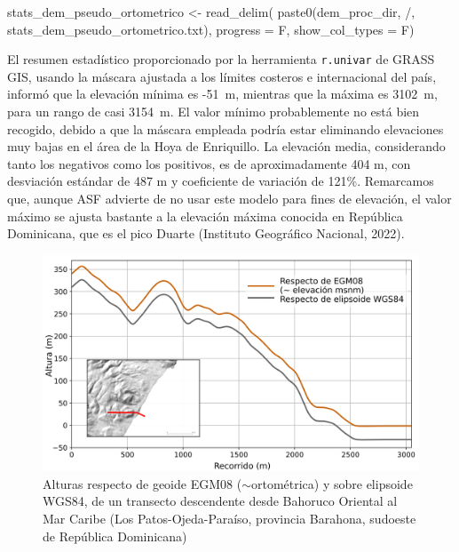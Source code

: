 \documentclass[spanish]{article}
\newenvironment{Shaded}{\begin{snugshade}}{\end{snugshade}}
\newcommand{\AttributeTok}[1]{\textcolor[rgb]{0.77,0.63,0.00}{#1}}
\newcommand{\FunctionTok}[1]{\textcolor[rgb]{0.00,0.00,0.00}{#1}}
\newcommand{\NormalTok}[1]{#1}
\newcommand{\OtherTok}[1]{\textcolor[rgb]{0.56,0.35,0.01}{#1}}
\newcommand{\StringTok}[1]{\textcolor[rgb]{0.31,0.60,0.02}{#1}}
\begin{document}
\begin{Shaded}
\begin{Highlighting}[]
\NormalTok{stats\_dem\_pseudo\_ortometrico }\OtherTok{\textless{}{-}} \FunctionTok{read\_delim}\NormalTok{(}
  \FunctionTok{paste0}\NormalTok{(dem\_proc\_dir, }\StringTok{\textquotesingle{}/\textquotesingle{}}\NormalTok{,}
         \StringTok{\textquotesingle{}stats\_dem\_pseudo\_ortometrico.txt\textquotesingle{}}\NormalTok{),}
  \AttributeTok{progress =}\NormalTok{ F, }\AttributeTok{show\_col\_types =}\NormalTok{ F)}
\end{Highlighting}
\end{Shaded}

El resumen estadístico proporcionado por la herramienta
\texttt{r.univar} de GRASS GIS, usando la máscara ajustada a los límites
costeros e internacional del país, informó que la elevación mínima es
-51~m, mientras que la máxima es 3102~m, para un rango de casi 3154~m.
El valor mínimo probablemente no está bien recogido, debido a que la
máscara empleada podría estar eliminando elevaciones muy bajas en el
área de la Hoya de Enriquillo. La elevación media, considerando tanto
los negativos como los positivos, es de aproximadamente 404 m, con
desviación estándar de 487 m y coeficiente de variación de 121\%.
Remarcamos que, aunque ASF advierte de no usar este modelo para fines de
elevación, el valor máximo se ajusta bastante a la elevación máxima
conocida en República Dominicana, que es el pico Duarte (Instituto
Geográfico Nacional, 2022).

\begin{figure}

{\centering \includegraphics[width=0.8\linewidth]{figuras/perfiles-dem/los-patos} 

}

\caption{Alturas respecto de geoide EGM08 ($\sim$ortométrica) y sobre elipsoide WGS84, de un transecto descendente desde Bahoruco Oriental al Mar Caribe (Los Patos-Ojeda-Paraíso, provincia Barahona, sudoeste de República Dominicana)}\label{fig:alturasgeoideelipsoide}
\end{figure}
\end{document}

